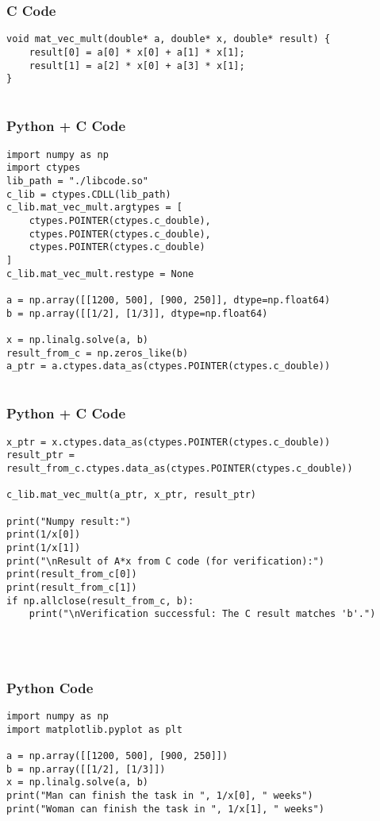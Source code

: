 \documentclass{beamer}
\begin{document}
\begin{frame}[fragile]
    \frametitle{C Code}
    \begin{lstlisting}
void mat_vec_mult(double* a, double* x, double* result) {
    result[0] = a[0] * x[0] + a[1] * x[1];
    result[1] = a[2] * x[0] + a[3] * x[1];
}


    \end{lstlisting}
\end{frame}
\begin{frame}[fragile]
    \frametitle{Python + C Code}
    \begin{lstlisting}
import numpy as np
import ctypes
lib_path = "./libcode.so" 
c_lib = ctypes.CDLL(lib_path)
c_lib.mat_vec_mult.argtypes = [
    ctypes.POINTER(ctypes.c_double),
    ctypes.POINTER(ctypes.c_double),
    ctypes.POINTER(ctypes.c_double)
]
c_lib.mat_vec_mult.restype = None

a = np.array([[1200, 500], [900, 250]], dtype=np.float64)
b = np.array([[1/2], [1/3]], dtype=np.float64)

x = np.linalg.solve(a, b)
result_from_c = np.zeros_like(b)
a_ptr = a.ctypes.data_as(ctypes.POINTER(ctypes.c_double))


    \end{lstlisting}
\end{frame}
\begin{frame}[fragile]
    \frametitle{Python + C Code}
    \begin{lstlisting}
x_ptr = x.ctypes.data_as(ctypes.POINTER(ctypes.c_double))
result_ptr = result_from_c.ctypes.data_as(ctypes.POINTER(ctypes.c_double))

c_lib.mat_vec_mult(a_ptr, x_ptr, result_ptr)

print("Numpy result:")
print(1/x[0])
print(1/x[1])
print("\nResult of A*x from C code (for verification):")
print(result_from_c[0])
print(result_from_c[1])
if np.allclose(result_from_c, b):
    print("\nVerification successful: The C result matches 'b'.")




    \end{lstlisting}
\end{frame}
\begin{frame}[fragile]
    \frametitle{Python Code}
    \begin{lstlisting}
import numpy as np
import matplotlib.pyplot as plt

a = np.array([[1200, 500], [900, 250]])
b = np.array([[1/2], [1/3]])
x = np.linalg.solve(a, b)
print("Man can finish the task in ", 1/x[0], " weeks")
print("Woman can finish the task in ", 1/x[1], " weeks")



    \end{lstlisting}
\end{frame}
\end{document}
